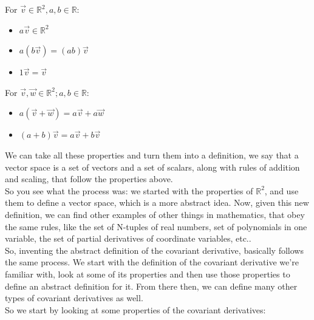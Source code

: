 For $\vec{v} \in \mathbb{R}^2, a, b \in \mathbb{R}$:
\begin{itemize}
    \item $a\vec{v} \in \mathbb{R}^2$
    \item $a(b\vec{v}) = (ab)\vec{v}$
    \item $1\vec{v} = \vec{v}$
\end{itemize}

For $\vec{v}, \vec{w} \in \mathbb{R}^2; a, b \in \mathbb{R}$:
\begin{itemize}
    \item $a(\vec{v} + \vec{w}) = a\vec{v} + a\vec{w}$
    \item $(a + b)\vec{v} = a\vec{v} + b\vec{v}$
\end{itemize}

We can take all these properties and turn them into a definition, we say that a vector space
is a set of vectors and a set of scalars, along with rules of addition and scaling, that follow the properties above.\\

So you see what the process was: we started with the properties of $\mathbb{R}^2$, and use them to define a vector space, 
which is a more abstract idea.
Now, given this new definition, we can find other examples of other things in mathematics, that obey the same rules, like the set
of N-tuples of real numbers, set of polynomials in one variable, the set of partial derivatives of coordinate variables, etc..\\

So, inventing the abstract definition of the covariant derivative, basically follows the same process. We start with the definition 
of the covariant derivative we're familiar with, look at some of its properties and then use those properties to define an abstract definition for it.
From there then, we can define many other types of covariant derivatives as well.\\

So we start by looking at some properties of the covariant derivatives:

